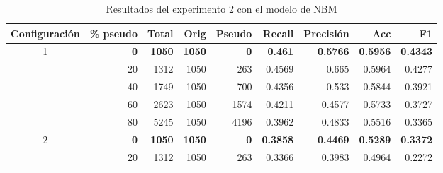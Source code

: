 \documentclass[a4paper]{llncs}
\begin{document}
\begin{table}[htbp!]
\centering
\caption{Resultados del experimento 2 con el modelo de NBM}
\label{tab:exp_2_nbm}
\begin{tabular}{crrrrrrrr}
\hline
\multicolumn{1}{c}{Configuración} & \multicolumn{1}{r}{\% pseudo} & \multicolumn{1}{r}{Total} & \multicolumn{1}{r}{Orig} & \multicolumn{1}{r}{Pseudo} & \multicolumn{1}{r}{Recall} & \multicolumn{1}{r}{Precisión} & \multicolumn{1}{r}{Acc} & \multicolumn{1}{r}{F1} \\ \hline
\multirow{5}{*}{1}              & \textbf{0}                    & \textbf{1050}             & \textbf{1050}            & \textbf{0}                 & \textbf{0.461}             & \textbf{0.5766}               & \textbf{0.5956}         & \textbf{0.4343}        \\
                                & 20                            & 1312                      & 1050                     & 263                        & 0.4569                     & 0.665                         & 0.5964                  & 0.4277                 \\
                                & 40                            & 1749                      & 1050                     & 700                        & 0.4356                     & 0.533                         & 0.5844                  & 0.3921                 \\
                                & 60                            & 2623                      & 1050                     & 1574                       & 0.4211                     & 0.4577                        & 0.5733                  & 0.3727                 \\
                                & 80                            & 5245                      & 1050                     & 4196                       & 0.3962                     & 0.4833                        & 0.5516                  & 0.3365                 \\ \hline
\multirow{5}{*}{2}              & \textbf{0}                    & \textbf{1050}             & \textbf{1050}            & \textbf{0}                 & \textbf{0.3858}            & \textbf{0.4469}               & \textbf{0.5289}         & \textbf{0.3372}        \\
                                & 20                            & 1312                      & 1050                     & 263                        & 0.3366                     & 0.3983                        & 0.4964                  & 0.2272                 \\

\end{tabular}
\end{table}
\end{document}
